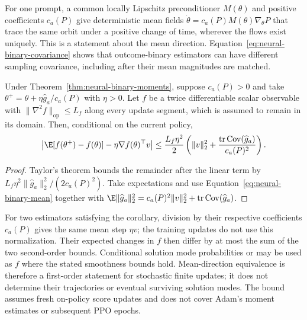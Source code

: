 For one prompt, a common locally Lipschitz preconditioner $M(\theta)$ and
positive coefficients $c_a(P)$ give deterministic mean fields
$\dot\theta=c_a(P)M(\theta)\nabla_\theta P$ that trace the same orbit
under a positive change of time, wherever the flows exist uniquely.
This is a statement about the mean direction. Equation~\eqref{eq:neural-binary-covariance}
shows that outcome-binary estimators can have different sampling covariance,
including after their mean magnitudes are matched.

\begin{corollary}
\enforcehalffinalproseline
\label{cor:neural-binary-finite-step}
Under Theorem~\ref{thm:neural-binary-moments}, suppose $c_a(P)>0$ and take
$\theta^+=\theta+\eta\widehat g_a/c_a(P)$ with $\eta>0$. Let $f$ be a
twice differentiable scalar observable with
$\|\nabla^2f\|_{\mathrm{op}}\le L_f$ along every update segment, which
is assumed to remain in its domain. Then, conditional on the current policy,
\begin{equation}
 \left|\E[f(\theta^+)-f(\theta)]
       -\eta\nabla f(\theta)^\top v\right|
 \le\frac{L_f\eta^2}{2}
 \left(\|v\|_2^2+
       \frac{\operatorname{tr}\operatorname{Cov}(\widehat g_a)}{c_a(P)^2}
 \right).
 \label{eq:neural-binary-finite-step}
\end{equation}
\end{corollary}

\begin{proof}
\enforcehalffinalproseline
Taylor's theorem bounds the remainder after the linear term by
$L_f\eta^2\|\widehat g_a\|_2^2/(2c_a(P)^2)$. Take expectations and use
Equation~\eqref{eq:neural-binary-mean} together with
$\E\|\widehat g_a\|_2^2
=c_a(P)^2\|v\|_2^2+\operatorname{tr}\operatorname{Cov}(\widehat g_a)$.
\end{proof}

For two estimators satisfying the corollary, division by their respective
coefficients $c_a(P)$ gives the same mean step $\eta v$; the training updates
do not use this normalization. Their expected changes in $f$ then differ by
at most the sum of the two second-order bounds. Conditional solution mode
probabilities or \pmd{} may be used as $f$ where the stated smoothness bounds
hold. Mean-direction equivalence is
therefore a first-order statement for stochastic finite updates; it does
not determine their trajectories or eventual surviving solution modes.
The bound assumes fresh on-policy score updates and does not cover Adam's
moment estimates or subsequent PPO epochs.

